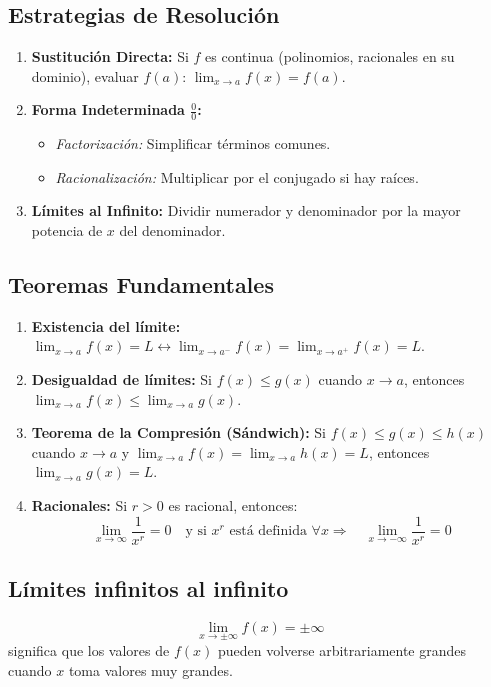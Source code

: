 \documentclass[a4paper,12pt]{article}
\theoremstyle{definition}
\begin{document}
\subsection{Estrategias de Resolución}
\begin{enumerate}
    \item \textbf{Sustitución Directa:} Si $f$ es continua (polinomios, racionales en su dominio), evaluar $f(a)$: $\lim_{x \to a} f(x) = f(a)$.
    \item \textbf{Forma Indeterminada $\frac{0}{0}$:}
    \begin{itemize}
        \item \textit{Factorización:} Simplificar términos comunes.
        \item \textit{Racionalización:} Multiplicar por el conjugado si hay raíces.
    \end{itemize}
    \item \textbf{Límites al Infinito:} Dividir numerador y denominador por la mayor potencia de $x$ del denominador.
\end{enumerate}

\subsection{Teoremas Fundamentales}
\begin{enumerate}
    \item \textbf{Existencia del límite:} $\lim_{x \to a} f(x) = L \leftrightarrow \lim_{x \to a^-} f(x) = \lim_{x \to a^+} f(x) = L$.
    \item \textbf{Desigualdad de límites:} Si $f(x) \leqslant g(x)$ cuando $x \to a$, entonces $\lim_{x \to a} f(x) \leqslant \lim_{x \to a} g(x)$.
    \item \textbf{Teorema de la Compresión (Sándwich):} Si $f(x) \leqslant g(x) \leqslant h(x)$ cuando $x \to a$ y $\lim_{x\to a} f(x) = \lim_{x\to a} h(x) = L$, entonces $\lim_{x\to a} g(x) = L$.
    \item \textbf{Racionales: } Si $r > 0$ es racional, entonces:
    \[\lim_{x \to \infty} \frac{1}{x^r} = 0 \quad \text{y si $x^r$ está definida $\forall x$} \Rightarrow \quad \lim_{x \to -\infty} \frac{1}{x^r} = 0\]
\end{enumerate}

\subsection{Límites infinitos al infinito}
\[ \lim_{x \to \pm \infty} f(x) = \pm \infty \] significa que los valores de $f(x)$ pueden volverse arbitrariamente grandes cuando $x$ toma valores muy grandes.
\end{document}
